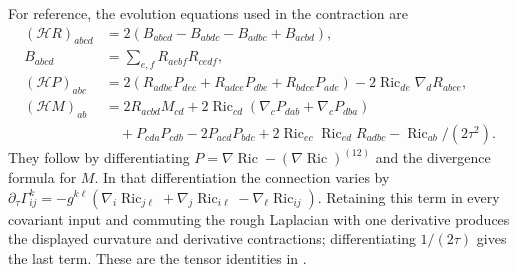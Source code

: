 For reference, the evolution equations used in the contraction are
\[
\begin{split}
 (\mathcal HR)_{abcd}
 &=2(B_{abcd}-B_{abdc}-B_{adbc}+B_{acbd}),\\
 B_{abcd}&=\sum_{e,f}R_{aebf}R_{cedf},\\
 (\mathcal HP)_{abc}
 &=2(R_{adbe}P_{dec}+R_{adce}P_{dbe}+R_{bdce}P_{ade})
       -2\operatorname{Ric}_{de}\nabla_dR_{abce},\\
 (\mathcal HM)_{ab}
 &=2R_{acbd}M_{cd}
   +2\operatorname{Ric}_{cd}(\nabla_cP_{dab}+\nabla_cP_{dba})\\
 &\quad+P_{cda}P_{cdb}-2P_{acd}P_{bdc}
   +2\operatorname{Ric}_{ec}\operatorname{Ric}_{ed}R_{adbc}
   -\operatorname{Ric}_{ab}/(2\tau^2).
\end{split}
\]
They follow by differentiating $P=\nabla\operatorname{Ric}
-(\nabla\operatorname{Ric})^{(12)}$ and the divergence formula
for $M$.  In that differentiation the connection varies by
$\partial_\tau\Gamma^k_{ij}
=-g^{k\ell}(\nabla_i\operatorname{Ric}_{j\ell}
+\nabla_j\operatorname{Ric}_{i\ell}-\nabla_\ell\operatorname{Ric}_{ij})$.
Retaining this term in every covariant input and commuting the rough
Laplacian with one derivative produces the displayed curvature and
derivative contractions; differentiating $1/(2\tau)$ gives the last
term.  These are the tensor identities in
\cite[Lemmas 15.18--15.19, equations (15.45)--(15.47),
pp.~273--277]{ChowEtAl2008}.

